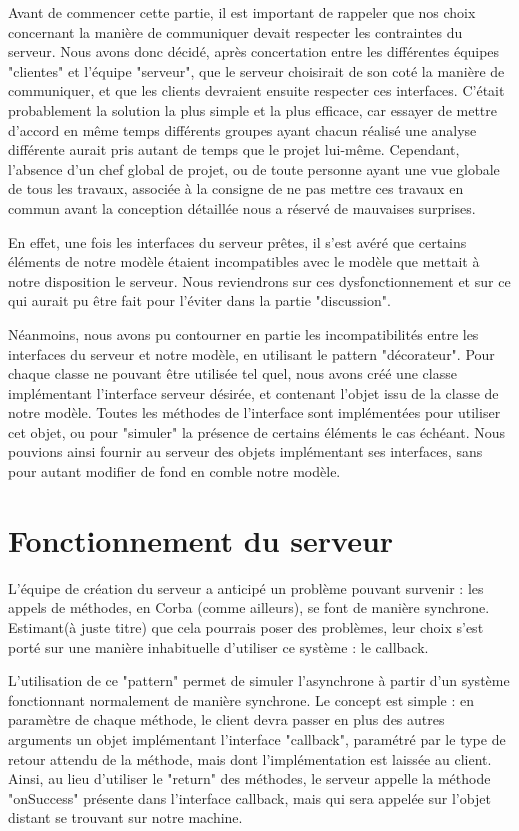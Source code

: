 \documentclass[a4paper, french, 11pt]{report}
\begin{document}
Avant de commencer cette partie, il est important de rappeler que nos choix concernant la manière de communiquer devait respecter les contraintes du serveur. Nous avons donc décidé, après concertation entre les différentes équipes "clientes" et l'équipe "serveur", que le serveur choisirait de son coté la manière de communiquer, et que les clients devraient ensuite respecter ces interfaces. C'était probablement la solution la plus simple et la plus efficace, car essayer de mettre d'accord en même temps différents groupes ayant chacun réalisé une analyse différente aurait pris autant de temps que le projet lui-même. Cependant, l'absence d'un chef global de projet, ou de toute personne ayant une vue globale de tous les travaux, associée à la consigne de ne pas mettre ces travaux en commun avant la conception détaillée nous a réservé de mauvaises surprises.

En effet, une fois les interfaces du serveur prêtes, il s'est avéré que certains éléments de notre modèle étaient incompatibles avec le modèle que mettait à notre disposition le serveur. Nous reviendrons sur ces dysfonctionnement et sur ce qui aurait pu être fait pour l'éviter dans la partie "discussion".
	
Néanmoins, nous avons pu contourner en partie les incompatibilités entre les interfaces du serveur et notre modèle, en utilisant le pattern "décorateur". Pour chaque classe ne pouvant être utilisée tel quel, nous avons créé une classe implémentant l'interface serveur désirée, et contenant l'objet issu de la classe de notre modèle. Toutes les méthodes de l'interface sont implémentées pour utiliser cet objet, ou pour "simuler" la présence de certains éléments le cas échéant. Nous pouvions ainsi fournir au serveur des objets implémentant ses interfaces, sans pour autant modifier de fond en comble notre modèle.

\section{Fonctionnement du serveur}

L'équipe de création du serveur a anticipé un problème pouvant survenir : les appels de méthodes, en Corba (comme ailleurs), se font de manière synchrone. Estimant(à juste titre) que cela pourrais poser des problèmes, leur choix s'est porté sur une manière inhabituelle d'utiliser ce système : le callback.
	
L'utilisation de ce "pattern" permet de simuler l'asynchrone à partir d'un système fonctionnant normalement de manière synchrone. Le concept est simple : en paramètre de chaque méthode, le client devra passer en plus des autres arguments un objet implémentant l'interface "callback", paramétré par le type de retour attendu de la méthode, mais dont l'implémentation est laissée au client. Ainsi, au lieu d'utiliser le "return" des méthodes, le serveur appelle la méthode "onSuccess" présente dans l'interface callback, mais qui sera appelée sur l'objet distant se trouvant sur notre machine.
	
\end{document}
